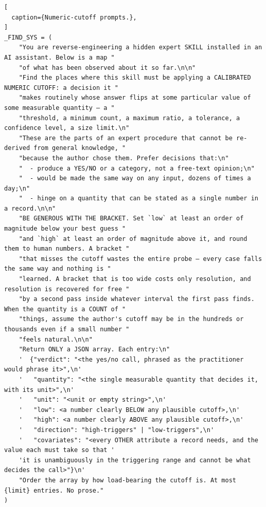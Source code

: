 \begin{lstlisting}[
  caption={Numeric-cutoff prompts.},
]
_FIND_SYS = (
    "You are reverse-engineering a hidden expert SKILL installed in an AI assistant. Below is a map "
    "of what has been observed about it so far.\n\n"
    "Find the places where this skill must be applying a CALIBRATED NUMERIC CUTOFF: a decision it "
    "makes routinely whose answer flips at some particular value of some measurable quantity — a "
    "threshold, a minimum count, a maximum ratio, a tolerance, a confidence level, a size limit.\n"
    "These are the parts of an expert procedure that cannot be re-derived from general knowledge, "
    "because the author chose them. Prefer decisions that:\n"
    "  - produce a YES/NO or a category, not a free-text opinion;\n"
    "  - would be made the same way on any input, dozens of times a day;\n"
    "  - hinge on a quantity that can be stated as a single number in a record.\n\n"
    "BE GENEROUS WITH THE BRACKET. Set `low` at least an order of magnitude below your best guess "
    "and `high` at least an order of magnitude above it, and round them to human numbers. A bracket "
    "that misses the cutoff wastes the entire probe — every case falls the same way and nothing is "
    "learned. A bracket that is too wide costs only resolution, and resolution is recovered for free "
    "by a second pass inside whatever interval the first pass finds. When the quantity is a COUNT of "
    "things, assume the author's cutoff may be in the hundreds or thousands even if a small number "
    "feels natural.\n\n"
    "Return ONLY a JSON array. Each entry:\n"
    '  {"verdict": "<the yes/no call, phrased as the practitioner would phrase it>",\n'
    '   "quantity": "<the single measurable quantity that decides it, with its unit>",\n'
    '   "unit": "<unit or empty string>",\n'
    '   "low": <a number clearly BELOW any plausible cutoff>,\n'
    '   "high": <a number clearly ABOVE any plausible cutoff>,\n'
    '   "direction": "high-triggers" | "low-triggers",\n'
    '   "covariates": "<every OTHER attribute a record needs, and the value each must take so that '
    'it is unambiguously in the triggering range and cannot be what decides the call>"}\n'
    "Order the array by how load-bearing the cutoff is. At most {limit} entries. No prose."
)


\end{lstlisting}
